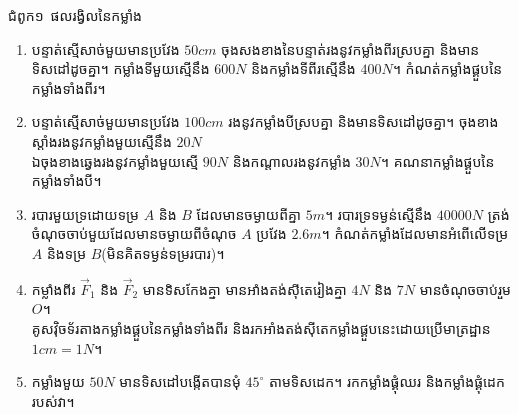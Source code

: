 \documentclass{officialexam}
\begin{document}
	\begin{center}
		\sffamily\color{blue}
		\huge ជំពូក១~\color{red}ផលរង្វិលនៃកម្លាំង
	\end{center}
	\begin{enumerate}[m]
		\item បន្ទាត់ស្មើសាច់មួយមានប្រវែង $50cm$ ចុងសងខាងនៃបន្ទាត់រងនូវកម្លាំងពីរស្របគ្នា និងមានទិសដៅដូចគ្នា។ កម្លាំងទីមួយស្មើនឹង $600N$ និងកម្លាំងទីពីរស្មើនឹង $400N$។ កំណត់កម្លាំងផ្គួបនៃកម្លាំងទាំងពីរ។
		\item បន្ទាត់ស្មើសាច់មួយមានប្រវែង $100cm$ រងនូវកម្លាំងបីស្របគ្នា និងមានទិសដៅដូចគ្នា។ ចុងខាងស្តាំងរងនូវកម្លាំងមួយស្មើនឹង $20N$\\ ឯចុងខាងឆ្វេងរងនូវកម្លាំងមួយស្មើ $90N$ និងកណ្តាលរងនូវកម្លាំង $30N$។ គណនាកម្លាំងផ្គួបនៃកម្លាំងទាំងបី។
		\item របារមួយទ្រដោយទម្រ $A$ និង $B$ ដែលមានចម្ងាយពីគ្នា $5m$។ របារទ្រទម្ងន់ស្មើនឹង $40000N$ ត្រង់ចំណុចចាប់មួយដែលមានចម្ងាយពីចំណុច $A$ ប្រវែង $2.6m$។ កំណត់កម្លាំងដែលមានអំពើលើទម្រ $A$ និងទម្រ $B$(មិនគិតទម្ងន់ទម្ររបារ)។
		\item កម្លាំងពីរ $\overrightarrow{F}_{1}$ និង $\overrightarrow{F}_{2}$ មានទិសកែងគ្នា មានអាំងតង់សុីតេរៀងគ្នា $4N$ និង $7N$ មានចំណុចចាប់រួម $O$។\\
		គូសវុិចទ័រតាងកម្លាំងផ្គួបនៃកម្លាំងទាំងពីរ និងរកអាំងតង់សុីតេកម្លាំងផ្គួបនេះដោយប្រើមាត្រដ្ឋាន $1cm=1N$។
		\item កម្លាំងមួយ $50N$ មានទិសដៅបង្កើតបានមុំ $45^\circ$ តាមទិសដេក។ រកកម្លាំងផ្គុំឈរ និងកម្លាំងផ្គុំដេករបស់វា។ 
	\end{enumerate}
\end{document}
